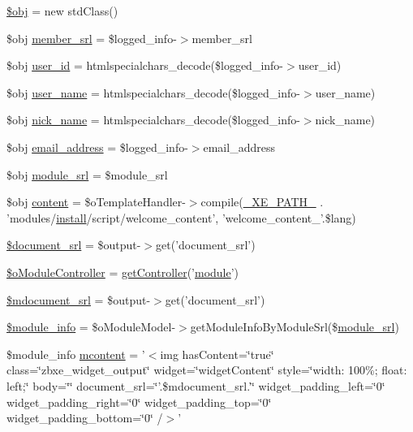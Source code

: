 \begin{DoxyCompactItemize}
\item 
\hyperlink{ko_8install_8php_a9008ed94ba185855b1723e367744b87e}{\$obj} = new std\-Class()
\item 
\$obj \hyperlink{ko_8install_8php_aa61f9e08f0fe505094d26f8143f30bbd}{member\-\_\-srl} = \$logged\-\_\-info-\/$>$member\-\_\-srl
\item 
\$obj \hyperlink{ko_8install_8php_a74f1a394389d774e5b4cd5d1d15413f7}{user\-\_\-id} = htmlspecialchars\-\_\-decode(\$logged\-\_\-info-\/$>$user\-\_\-id)
\item 
\$obj \hyperlink{ko_8install_8php_a115401aff7da80e73c66e9f76505426b}{user\-\_\-name} = htmlspecialchars\-\_\-decode(\$logged\-\_\-info-\/$>$user\-\_\-name)
\item 
\$obj \hyperlink{ko_8install_8php_a151ecae87a1f3d7e257aa089803086bd}{nick\-\_\-name} = htmlspecialchars\-\_\-decode(\$logged\-\_\-info-\/$>$nick\-\_\-name)
\item 
\$obj \hyperlink{ko_8install_8php_a1dffea0d5ba8194f8ef01f414af0c831}{email\-\_\-address} = \$logged\-\_\-info-\/$>$email\-\_\-address
\item 
\$obj \hyperlink{ko_8install_8php_a370bb6450fab1da3e0ed9f484a38b761}{module\-\_\-srl} = \$module\-\_\-srl
\item 
\$obj \hyperlink{ko_8install_8php_a65dddc3e5e47cb506e6b5417ffb3bdef}{content} = \$o\-Template\-Handler-\/$>$compile(\hyperlink{config_8inc_8php_a5387c7a3f2aa38adf16f324cee88db88}{\-\_\-\-X\-E\-\_\-\-P\-A\-T\-H\-\_\-} . 'modules/\hyperlink{classinstall}{install}/script/welcome\-\_\-content', 'welcome\-\_\-content\-\_\-'.\$lang)
\item 
\hyperlink{ko_8install_8php_a14522e7fff0604a8372c75b4a0fbc0fd}{\$document\-\_\-srl} = \$output-\/$>$get('document\-\_\-srl')
\item 
\hyperlink{ko_8install_8php_a9fd93f6625cec4fd65bf6f412e28c015}{\$o\-Module\-Controller} = \hyperlink{func_8inc_8php_aa08f01e3bf130d770b373ca8493e3e9b}{get\-Controller}('\hyperlink{classmodule}{module}')
\item 
\hyperlink{ko_8install_8php_a27c211d9a984964f84c8ffb6ea7328fc}{\$mdocument\-\_\-srl} = \$output-\/$>$get('document\-\_\-srl')
\item 
\hyperlink{ko_8install_8php_a5e701819149f6ea0893d4b79010417d3}{\$module\-\_\-info} = \$o\-Module\-Model-\/$>$get\-Module\-Info\-By\-Module\-Srl(\$\hyperlink{ko_8install_8php_a370bb6450fab1da3e0ed9f484a38b761}{module\-\_\-srl})
\item 
\$module\-\_\-info \hyperlink{ko_8install_8php_a9da4bb6e77356bb68ae0e05dbd9f5e2f}{mcontent} = '$<$img has\-Content=\char`\"{}true\char`\"{} class=\char`\"{}zbxe\-\_\-widget\-\_\-output\char`\"{} widget=\char`\"{}widget\-Content\char`\"{} style=\char`\"{}width\-: 100\%; float\-: left;\char`\"{} body=\char`\"{}\char`\"{} document\-\_\-srl=\char`\"{}'.\$mdocument\-\_\-srl.'\char`\"{} widget\-\_\-padding\-\_\-left=\char`\"{}0\char`\"{} widget\-\_\-padding\-\_\-right=\char`\"{}0\char`\"{} widget\-\_\-padding\-\_\-top=\char`\"{}0\char`\"{} widget\-\_\-padding\-\_\-bottom=\char`\"{}0\char`\"{} /$>$'

\end{DoxyCompactItemize}
